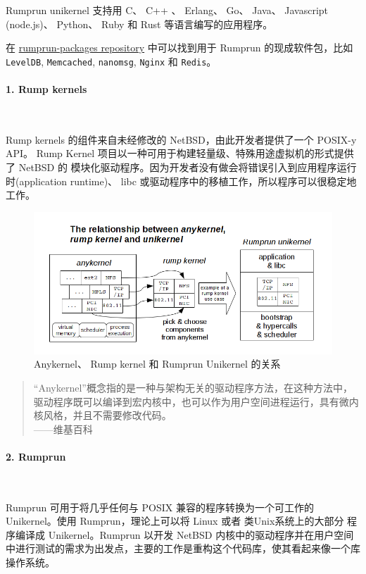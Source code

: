 \documentclass{../runikraft-report}
\begin{document}
Rumprun unikernel 支持用 C、 C++ 、 Erlang、 Go、
Java、 Javascript (node.js)、 Python、 Ruby 和 Rust 等语言编写的应用程序。

在 \href{https://github.com/rumpkernel/rumprun-packages}{rumprun-packages repository}
中可以找到用于 Rumprun 的现成软件包，比如 \texttt{LevelDB},
\texttt{Memcached}, \texttt{nanomsg}, \texttt{Nginx} 和 \texttt{Redis}。

\paragraph{1. Rump kernels}~

Rump kernels 的组件来自未经修改的 NetBSD，由此开发者提供了一个 POSIX-y API。
Rump Kernel 项目以一种可用于构建轻量级、特殊用途虚拟机的形式提供了 NetBSD 的
模块化驱动程序。因为开发者没有做会将错误引入到应用程序运行时(application runtime)、
libc 或驱动程序中的移植工作，所以程序可以很稳定地工作。\cite{bib:21-rump-kernel}
\begin{figure}[!hbt]
\includegraphics[width=\linewidth]{pictures/rumprun-1.png}
\caption{Anykernel、
Rump kernel 和 Rumprun Unikernel 的关系}
\end{figure}

\begin{quote}
“Anykernel”概念指的是一种与架构无关的驱动程序方法，在这种方法中，驱动程序既可以编译到宏内核中，也可以作为用户空间进程运行，具有微内核风格，并且不需要修改代码。\\
\hspace*{\fill}——维基百科
\end{quote}

\paragraph{2. Rumprun}~

Rumprun 可用于将几乎任何与 POSIX 兼容的程序转换为一个可工作的
Unikernel。使用 Rumprun，理论上可以将 Linux 或者 类Unix系统上的大部分
程序编译成 Unikernel。Rumprun 以开发 NetBSD 内核中的驱动程序并在用户空间
中进行测试的需求为出发点，主要的工作是重构这个代码库，使其看起来像一个库操作系统。\cite{bib:24-rumrun}
\end{document}

